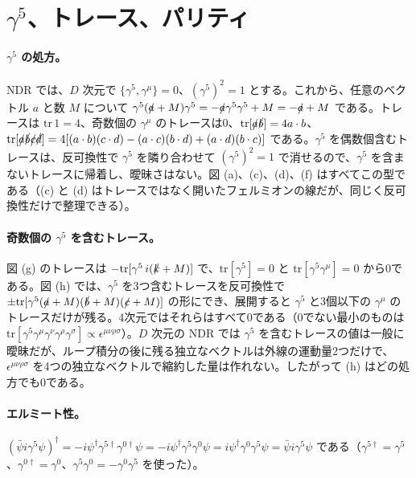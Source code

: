 \documentclass[a4paper,10pt]{ltjsarticle}
\begin{document}
\section{$\gamma^5$、トレース、パリティ}\label{app:gamma5}

\paragraph{$\gamma^5$ の処方。}NDR では、$D$ 次元で $\{\gamma^5,\gamma^\mu\}=0$、$(\gamma^5)^2=1$ とする。これから、任意のベクトル $a$ と数 $M$ について $\gamma^5(\slashed a+M)\gamma^5=-\slashed a\gamma^5\gamma^5+M=-\slashed a+M$ である。トレースは $\mathrm{tr}\,1=4$、奇数個の $\gamma^\mu$ のトレースは0、$\mathrm{tr}[\slashed a\slashed b]=4a\cdot b$、$\mathrm{tr}[\slashed a\slashed b\slashed c\slashed d]=4[(a\cdot b)(c\cdot d)-(a\cdot c)(b\cdot d)+(a\cdot d)(b\cdot c)]$ である。$\gamma^5$ を偶数個含むトレースは、反可換性で $\gamma^5$ を隣り合わせて $(\gamma^5)^2=1$ で消せるので、$\gamma^5$ を含まないトレースに帰着し、曖昧さはない。図 (a)、(c)、(d)、(f) はすべてこの型である（(c) と (d) はトレースではなく開いたフェルミオンの線だが、同じく反可換性だけで整理できる）。

\paragraph{奇数個の $\gamma^5$ を含むトレース。}図 (g) のトレースは $-\mathrm{tr}[\gamma^5\,i(\slashed k+M)]$ で、$\mathrm{tr}[\gamma^5]=0$ と $\mathrm{tr}[\gamma^5\gamma^\mu]=0$ から0である。図 (h) では、$\gamma^5$ を3つ含むトレースを反可換性で $\pm\mathrm{tr}[\gamma^5(\slashed a+M)(\slashed b+M)(\slashed c+M)]$ の形にでき、展開すると $\gamma^5$ と3個以下の $\gamma^\mu$ のトレースだけが残る。4次元ではそれらはすべて0である（0でない最小のものは $\mathrm{tr}[\gamma^5\gamma^\mu\gamma^\nu\gamma^\rho\gamma^\sigma]\propto\epsilon^{\mu\nu\rho\sigma}$）。$D$ 次元の NDR では $\gamma^5$ を含むトレースの値は一般に曖昧だが、ループ積分の後に残る独立なベクトルは外線の運動量2つだけで、$\epsilon^{\mu\nu\rho\sigma}$ を4つの独立なベクトルで縮約した量は作れない。したがって (h) はどの処方でも0である。

\paragraph{エルミート性。}$(\bar\psi i\gamma^5\psi)^\dagger=-i\psi^\dagger\gamma^{5\dagger}\gamma^{0\dagger}\psi=-i\psi^\dagger\gamma^5\gamma^0\psi=i\psi^\dagger\gamma^0\gamma^5\psi=\bar\psi i\gamma^5\psi$ である（$\gamma^{5\dagger}=\gamma^5$、$\gamma^{0\dagger}=\gamma^0$、$\gamma^5\gamma^0=-\gamma^0\gamma^5$ を使った）。
\end{document}
